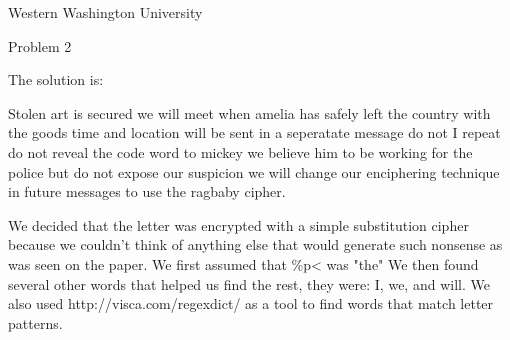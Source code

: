 \documentclass{article}%
\begin{document}
\begin{flushright}
Western Washington University \\
\end{flushright}

\begin{center}
Problem 2
\end{center}

The solution is: \\
\begin{center}
Stolen art is secured we will meet when amelia has safely left the country with the goods time and location will be sent in a seperatate message do not I repeat do not reveal the code word to mickey we believe him to be working for the police but do not expose our suspicion we will change our enciphering technique in future messages to use the ragbaby cipher.
\end{center}

We decided that the letter was encrypted with a simple substitution cipher because we couldn't think of anything else that would generate such nonsense as was seen on the paper.
We first assumed that \%p< was "the"
We then found several other words that helped us find the rest, they were: I, we, and will.
We also used http://visca.com/regexdict/ as a tool to find words that match letter patterns.
\end{document}
